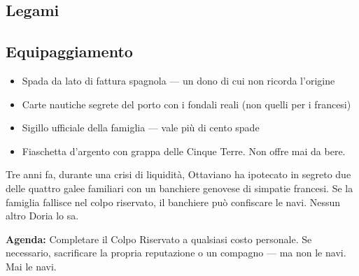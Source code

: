 \subsection*{Legami}

\subsection*{Equipaggiamento}
\begin{itemize}
  \item Spada da lato di fattura spagnola — un dono di cui non ricorda l'origine
  \item Carte nautiche segrete del porto con i fondali reali (non quelli per i francesi)
  \item Sigillo ufficiale della famiglia — vale più di cento spade
  \item Fiaschetta d'argento con grappa delle Cinque Terre. Non offre mai da bere.
\end{itemize}

\begin{secretbox}
Tre anni fa, durante una crisi di liquidità, Ottaviano ha ipotecato in segreto
due delle quattro galee familiari con un banchiere genovese di simpatie francesi.
Se la famiglia fallisce nel colpo riservato, il banchiere può confiscare le navi.
Nessun altro Doria lo sa.

\medskip
\textbf{\textcolor{SecretRed}{Agenda:}} Completare il Colpo Riservato a qualsiasi costo personale.
Se necessario, sacrificare la propria reputazione o un compagno — ma non le navi. Mai le navi.
\end{secretbox}

